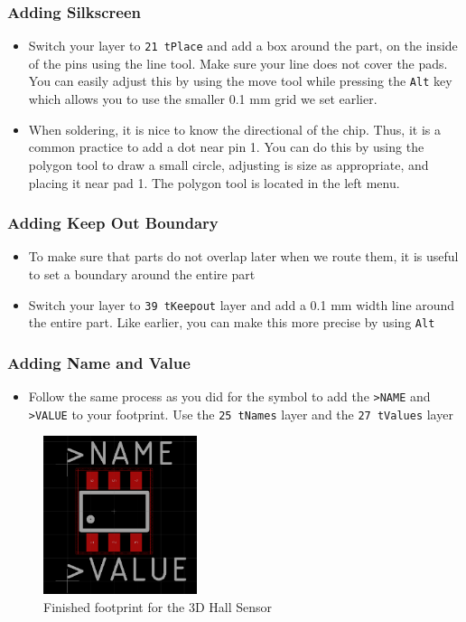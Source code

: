 \documentclass{article}
\begin{document}
\subsubsection{Adding Silkscreen}
\begin{itemize}
    \item Switch your layer to \texttt{21 tPlace} and add a box around the part, on the inside of the pins using the line tool. Make sure your line does not cover the pads. You can easily adjust this by using the move tool while pressing the \texttt{Alt} key which allows you to use the smaller 0.1 mm grid we set earlier. 
    \item When soldering, it is nice to know the directional of the chip. Thus, it is a common practice to add a dot near pin 1. You can do this by using the polygon tool to draw a small circle, adjusting is size as appropriate, and placing it near pad 1. The polygon tool is located in the left menu. 
\end{itemize}
\subsubsection{Adding Keep Out Boundary}
\begin{itemize}
    \item To make sure that parts do not overlap later when we route them, it is useful to set a boundary around the entire part
    \item Switch your layer to \texttt{39 tKeepout} layer and add a 0.1 mm width line around the entire part. Like earlier, you can make this more precise by using \texttt{Alt}
\end{itemize}
\subsubsection{Adding Name and Value}
\begin{itemize}
    \item Follow the same process as you did for the symbol to add the \texttt{>NAME} and \texttt{>VALUE} to your footprint. Use the \texttt{25 tNames} layer and the \texttt{27 tValues} layer
\end{itemize}
\begin{figure}[H]
    \center
	\includegraphics[width=0.4\textwidth, keepaspectratio]{images/footprint.png}
	\caption{Finished footprint for the 3D Hall Sensor}
	\label{fig:footprint}
\end{figure}
\end{document}

